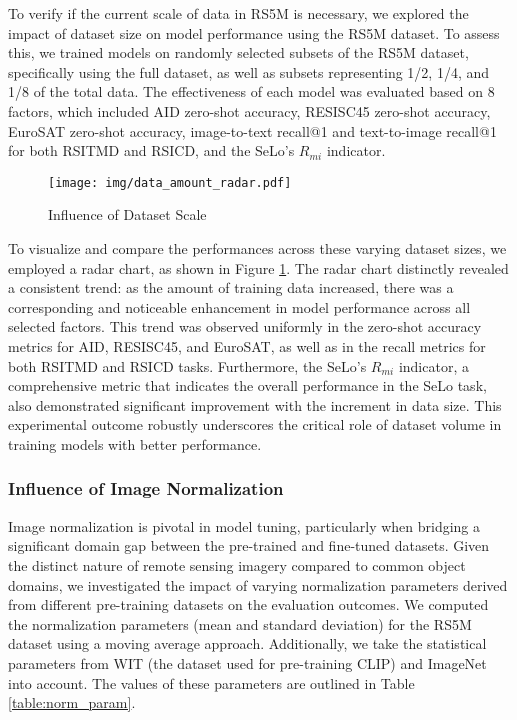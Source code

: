 \documentclass[journal]{IEEEtran}
\begin{document}
To verify if the current scale of data in RS5M is necessary, we explored the impact of dataset size on model performance using the RS5M dataset. To assess this, we trained models on randomly selected subsets of the RS5M dataset, specifically using the full dataset, as well as subsets representing 1/2, 1/4, and 1/8 of the total data. The effectiveness of each model was evaluated based on 8 factors, which included AID zero-shot accuracy, RESISC45 zero-shot accuracy, EuroSAT zero-shot accuracy, image-to-text recall@1 and text-to-image recall@1 for both RSITMD and RSICD, and the SeLo's $R_{mi}$ indicator.

\begin{figure}
    \centering
    \texttt{[image: img/data\_amount\_radar.pdf]}
    \caption{Influence of Dataset Scale}
    \label{fig:data_amount}
\end{figure}

To visualize and compare the performances across these varying dataset sizes, we employed a radar chart, as shown in Figure \ref{fig:data_amount}. The radar chart distinctly revealed a consistent trend: as the amount of training data increased, there was a corresponding and noticeable enhancement in model performance across all selected factors. This trend was observed uniformly in the zero-shot accuracy metrics for AID, RESISC45, and EuroSAT, as well as in the recall metrics for both RSITMD and RSICD tasks. Furthermore, the SeLo's $R_{mi}$ indicator, a comprehensive metric that indicates the overall performance in the SeLo task, also demonstrated significant improvement with the increment in data size. This experimental outcome robustly underscores the critical role of dataset volume in training models with better performance.

\subsubsection{Influence of Image Normalization}


Image normalization is pivotal in model tuning, particularly when bridging a significant domain gap between the pre-trained and fine-tuned datasets. Given the distinct nature of remote sensing imagery compared to common object domains, we investigated the impact of varying normalization parameters derived from different pre-training datasets on the evaluation outcomes. We computed the normalization parameters (mean and standard deviation) for the RS5M dataset using a moving average approach. Additionally, we take the statistical parameters from WIT (the dataset used for pre-training CLIP) and ImageNet into account. The values of these parameters are outlined in Table \ref{table:norm_param}.
\end{document}
